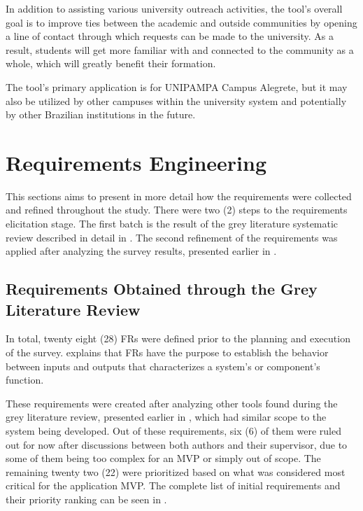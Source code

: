 In addition to assisting various university outreach activities, the tool's overall goal is to improve ties between the academic and outside communities by opening a line of contact through which requests can be made to the university.
As a result, students will get more familiar with and connected to the community as a whole, which will greatly benefit their formation.

The tool's primary application is for \ac{UNIPAMPA} Campus Alegrete, but it may also be utilized by other campuses within the university system and potentially by other Brazilian institutions in the future.

\section{Requirements Engineering}\label{ext:requirement-engineering}

This sections aims to present in more detail how the requirements were collected and refined throughout the study. There were two (2) steps to the requirements elicitation stage. The first batch is the result of the grey literature systematic review described in detail in . The second refinement of the requirements was applied after analyzing the survey results, presented earlier in .

\subsection{Requirements Obtained through the Grey Literature Review}\label{ext:requirements-grey}

In total, twenty eight (28) \acp{FR} were defined prior to the planning and execution of the survey.  explains that \acp{FR} have the purpose to establish the behavior between inputs and outputs that characterizes a system's or component's function.

These requirements were created after analyzing other tools found during the grey literature review, presented earlier in , which had similar scope to the system being developed. Out of these requirements, six (6) of them were ruled out for now after discussions between both authors and their supervisor, due to some of them being too complex for an \ac{MVP} or simply out of scope. The remaining twenty two (22) were prioritized based on what was considered most critical for the application \ac{MVP}. The complete list of initial requirements and their priority ranking can be seen in .

